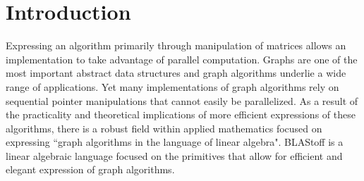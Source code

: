\section{Introduction}

Expressing an algorithm primarily through manipulation of matrices allows an implementation to take advantage of parallel computation. Graphs are one of the most important abstract data structures and graph algorithms underlie a wide range of applications. Yet many implementations of graph algorithms rely on sequential pointer manipulations that cannot easily be parallelized. As a result of the practicality and theoretical implications of more efficient expressions of these algorithms, there is a robust field within applied mathematics focused on expressing ``graph algorithms in the language of linear algebra"\cite{Kepner}. BLAStoff is a linear algebraic language focused on the primitives that allow for efficient and elegant expression of graph algorithms.
